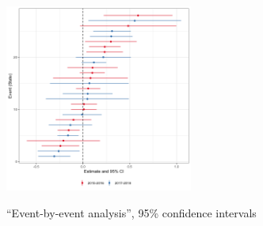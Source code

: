 \documentclass{beamer}
\begin{document}
\begin{frame}[label=event_by_event_figure, noframenumbering]%
\begin{figure}[H]
\centering
\caption{``Event-by-event analysis'', 95\% confidence intervals} 
\label{fig:CDLZ}
    
\includegraphics[width=0.55\textwidth]{Figures_pres/CDLZ_cov.png}
       \captionsetup{justification=centering}
 \\ 
  \hyperlink{stacked_analysis}{}  
    \hyperlink{identification2}{}  

 
\end{figure}   
 
\end{frame}
\end{document}
